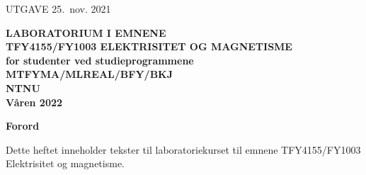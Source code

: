 \documentclass[../Elmag-labhefte-2021.tex]{subfiles}
\begin{document}
\hfill UTGAVE 25.\ nov. 2021 
\vspace*{40mm}
\begin{center}
\LARGE \bf LABORATORIUM I EMNENE \\[10mm]
TFY4155/FY1003 ELEKTRISITET OG MAGNETISME \\[20mm]    
for studenter ved studieprogrammene\\[10mm]    
MTFYMA/MLREAL/BFY/BKJ \\[15mm]    
NTNU\\[15mm]    
Våren 2022
\end{center}


\newpage
\phantom{.}

\newpage
{}
{\large \bf Forord}

Dette heftet inneholder tekster til laboratoriekurset til emnene TFY4155/FY1003 Elektrisitet og magnetisme. %




\end{document}
